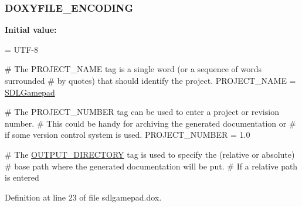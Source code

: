 \hypertarget{sdlgamepad_8dox_ac50780facdab5a469895066bc087eea5}{
\subsubsection[{D\-O\-X\-Y\-F\-I\-L\-E\-\_\-\-E\-N\-C\-O\-D\-I\-N\-G}]{\setlength{\rightskip}{0pt plus 5cm}D\-O\-X\-Y\-F\-I\-L\-E\-\_\-\-E\-N\-C\-O\-D\-I\-N\-G}}\label{sdlgamepad_8dox_ac50780facdab5a469895066bc087eea5}
{\bfseries Initial value\-:}
\begin{DoxyCode}
= UTF-8

\textcolor{preprocessor}{# The PROJECT\_NAME tag is a single word (or a sequence of words surrounded}
\textcolor{preprocessor}{}\textcolor{preprocessor}{# by quotes) that should identify the project.}
\textcolor{preprocessor}{}
PROJECT\_NAME           = \hyperlink{class_s_d_l_gamepad}{SDLGamepad}

\textcolor{preprocessor}{# The PROJECT\_NUMBER tag can be used to enter a project or revision number.}
\textcolor{preprocessor}{}\textcolor{preprocessor}{# This could be handy for archiving the generated documentation or}
\textcolor{preprocessor}{}\textcolor{preprocessor}{# if some version control system is used.}
\textcolor{preprocessor}{}
PROJECT\_NUMBER         = 1.0

# The \hyperlink{sdlgamepad_8dox_a0210526ada4ed067410fb4f078b8ae3f}{OUTPUT\_DIRECTORY} tag is used to specify the (relative or absolute)
\textcolor{preprocessor}{# base path where the generated documentation will be put.}
\textcolor{preprocessor}{# If a relative path is entered}
\end{DoxyCode}


Definition at line 23 of file sdlgamepad.\-dox.

